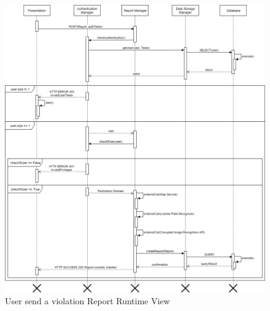 \begin{figure}[H]
          \includegraphics[scale=0.4]{Images/Seq_sendReport.png}
        \caption{User send a violation Report Runtime View}
\end{figure}

